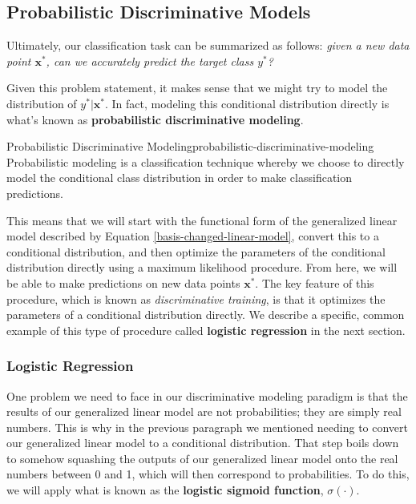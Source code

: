 \subsection{Probabilistic Discriminative Models}
Ultimately, our classification task can be summarized as follows: \textit{given a new data point $\textbf{x}^{*}$, can we accurately predict the target class $y^{*}$?}

Given this problem statement, it makes sense that we might try to model the distribution of $y^{*}|\textbf{x}^{*}$. In fact, modeling this conditional distribution directly is what's known as \textbf{probabilistic discriminative modeling}.

\begin{definition}{Probabilistic Discriminative Modeling}{probabilistic-discriminative-modeling}
    Probabilistic modeling is a classification technique whereby we choose to directly model the conditional class distribution in order to make classification predictions.
\end{definition}

This means that we will start with the functional form of the generalized linear model described by Equation \ref{basis-changed-linear-model}, convert this to a conditional distribution, and then optimize the parameters of the conditional distribution directly using a maximum likelihood procedure. From here, we will be able to make predictions on new data points $\textbf{x}^{*}$. The key feature of this procedure, which is known as \textit{discriminative training}, is that it optimizes the parameters of a conditional distribution directly. We describe a specific, common example of this type of procedure called \textbf{logistic regression} in the next section.

\subsubsection{Logistic Regression}
One problem we need to face in our discriminative modeling paradigm is that the results of our generalized linear model are not probabilities; they are simply real numbers. This is why in the previous paragraph we mentioned needing to convert our generalized linear model to a conditional distribution. That step boils down to somehow squashing the outputs of our generalized linear model onto the real numbers between 0 and 1, which will then correspond to probabilities. To do this, we will apply what is known as the \textbf{logistic sigmoid function}, $\sigma(\cdot)$.

